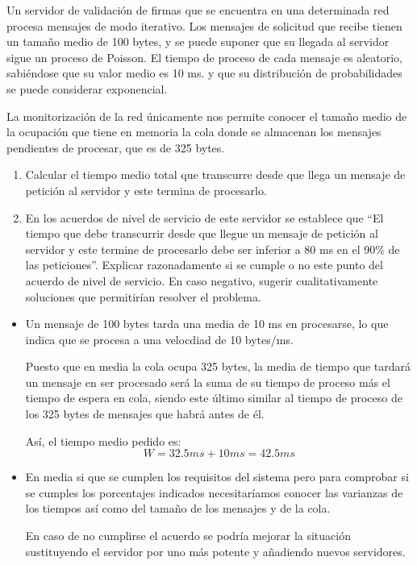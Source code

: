 \begin{problem}[19]
Un servidor de validación de firmas que se encuentra en una determinada red procesa mensajes de modo iterativo. Los mensajes de solicitud que recibe tienen un tamaño medio de 100 bytes, y se puede suponer que su llegada al servidor sigue un proceso de Poisson. El tiempo de proceso de cada mensaje es aleatorio, sabiéndose que su valor medio es 10 ms. y que su distribución de probabilidades se puede considerar exponencial.

La monitorización de la red únicamente nos permite conocer el tamaño medio de la ocupación que tiene en memoria la cola donde se almacenan los mensajes pendientes de procesar, que es de 325 bytes.
\begin{enumerate}
\item Calcular el tiempo medio total que transcurre desde que llega un mensaje de petición al servidor y este termina de procesarlo.
\item En los acuerdos de nivel de servicio de este servidor se establece que ``El tiempo que debe transcurrir desde que llegue un mensaje de petición al servidor y este termine de procesarlo debe ser inferior a 80 ms en el 90\% de las peticiones''. Explicar razonadamente si se cumple o no este punto del acuerdo de nivel de servicio. En caso negativo, sugerir cualitativamente soluciones que permitirían resolver el problema.
\end{enumerate}

\solution

\yoP

\begin{itemize}
\item

Un mensaje de 100 bytes tarda una media de 10 ms en procesarse, lo que indica que se procesa a una velocdiad de 10 bytes/ms.

Puesto que en media la cola ocupa 325 bytes, la media de tiempo que tardará un mensaje en ser procesado será la suma de su tiempo de proceso más el tiempo de espera en cola, siendo este último similar al tiempo de proceso de los 325 bytes de mensajes que habrá antes de él.

Así, el tiempo medio pedido es:
\[W=32.5ms+10ms=42.5ms\]

\item

En media si que se cumplen los requisitos del sistema pero para comprobar si se cumples los porcentajes indicados necesitaríamos conocer las varianzas de los tiempos así como del tamaño de los mensajes y de la cola.

En caso de no cumplirse el acuerdo se podría mejorar la situación sustituyendo el servidor por uno más potente y añadiendo nuevos servidores.

\end{itemize}

\end{problem}

